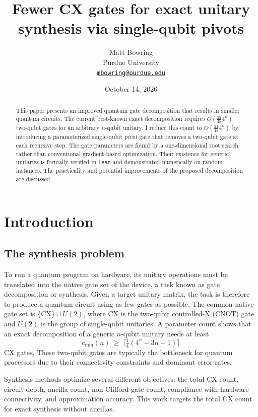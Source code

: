 \documentclass[11pt]{article}
\title{Fewer CX gates for exact unitary synthesis via single-qubit pivots}
\author{Matt Bowring\\[2pt]
{\normalsize Purdue University}\\[2pt]
{\normalsize\href{mailto:mbowring@purdue.edu}{\texttt{mbowring@purdue.edu}}}}
\date{October 14, 2026}
\begin{document}
\maketitle

\begin{abstract}
This paper presents an improved quantum gate decomposition that results in smaller quantum circuits.
The current best-known exact decomposition requires $O(\frac{22}{48} 4^n)$ two-qubit gates for an arbitrary $n$-qubit unitary. I reduce this count to $O(\frac{21}{48} 4^n)$ by introducing a parameterized single-qubit \emph{pivot} gate that removes a two-qubit gate at each recursive step. The gate parameters are found by a one-dimensional root search rather than conventional gradient-based optimization. Their existence for generic unitaries is formally verified in \texttt{Lean} and demonstrated numerically on random instances. The practicality and potential improvements of the proposed decomposition are discussed.
\end{abstract}

\section{Introduction}

\subsection{The synthesis problem}

To run a quantum program on hardware, its unitary operations must be translated into the native gate set of the device, a task known as gate decomposition or synthesis. Given a target unitary matrix, the task is therefore to produce a quantum circuit using as few gates as possible. The common native gate set is $\{\mathrm{CX}\}\cup U(2)$, where CX is the two-qubit controlled-X (CNOT) gate and $U(2)$ is the group of single-qubit unitaries. A parameter count shows that an exact decomposition of a generic $n$-qubit unitary needs at least~\cite{smb2q}
\[
c_{\min}(n)\ \ge\ \big\lceil \tfrac14(4^n-3n-1)\big\rceil
\]
CX gates. These two-qubit gates are typically the bottleneck for quantum processors due to their connectivity constraints and dominant error rates.

Synthesis methods optimize several different objectives: the total CX count, circuit depth, ancilla count, non-Clifford gate count, compliance with hardware connectivity, and approximation accuracy. This work targets the total CX count for exact synthesis without ancillas.
\end{document}
